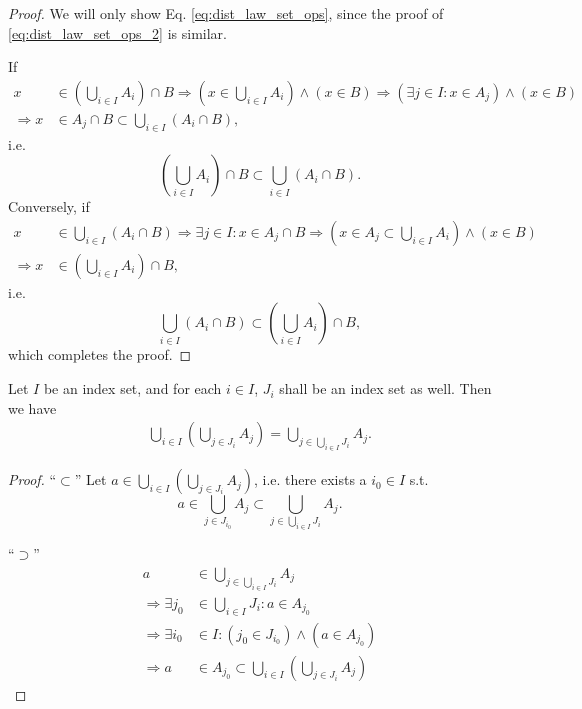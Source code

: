 \begin{proof}
	We will only show Eq. \eqref{eq:dist_law_set_ops}, since the proof of \eqref{eq:dist_law_set_ops_2} is similar.
	
	If 
	\begin{align*}
		x&\in \left(\bigcup_{i\in I} A_i\right) \cap B \Rightarrow \left(x\in \bigcup_{i\in I}A_i\right) \wedge \left(x\in B\right)\Rightarrow (\exists j\in I: x\in A_j) \wedge (x\in B)
		\\ \Rightarrow x&\in A_j\cap B \subset \bigcup_{i\in I}(A_i \cap B),
	\end{align*}
	i.e. $$\left(\bigcup_{i\in I} A_i\right) \cap B \subset \bigcup_{i\in I}(A_i \cap B).$$
	Conversely, if 
	\begin{align*}
		x&\in \bigcup_{i\in I}(A_i \cap B) \Rightarrow \exists j\in I: x\in A_j \cap B\Rightarrow \left(x\in A_j\subset \bigcup_{i\in I}A_i\right) \wedge \left(x\in B\right)
		\\ \Rightarrow x &\in \left(\bigcup_{i\in I}A_i\right) \cap B,
	\end{align*}
	i.e. 
	$$\bigcup_{i\in I}(A_i \cap B) \subset \left(\bigcup_{i\in I} A_i\right) \cap B,$$
	which completes the proof.
\end{proof}

\begin{theorem}\label{thrm:union_of_union_of_sets}
	Let $I$ be an index set, and for each $i\in I$, $J_i$ shall be an index set as well. Then we have \cite{878108}
	\begin{align}
		\bigcup_{i\in I}\left(\bigcup_{j\in J_i}A_j\right) = \bigcup_{j\in\bigcup_{i\in I}J_i}A_j.
	\end{align}		
\end{theorem}

\begin{proof}
	\enquote{$\subset$} Let $a\in \bigcup_{i\in I}\left(\bigcup_{j\in J_i}A_j\right)$, i.e. there exists a $i_0\in I$ s.t. $$a\in \bigcup_{j\in J_{i_0}}A_j\subset \bigcup_{j\in \bigcup_{i\in I}J_i}A_j.$$ 
	
	\enquote{$\supset$} 
	\begin{align*}
		a&\in \bigcup_{j\in\bigcup_{i\in I}J_i}A_j 
		\\ \Rightarrow \exists j_0&\in \bigcup_{i\in I}J_i: a\in A_{j_0}
		\\ \Rightarrow \exists i_0&\in I: \left(j_0\in J_{i_0}\right) \wedge \left(a\in A_{j_0}\right)
		\\ \Rightarrow a&\in A_{j_0}\subset \bigcup_{i\in I}\left(\bigcup_{j\in J_i}A_j\right)
	\end{align*}
\end{proof}

